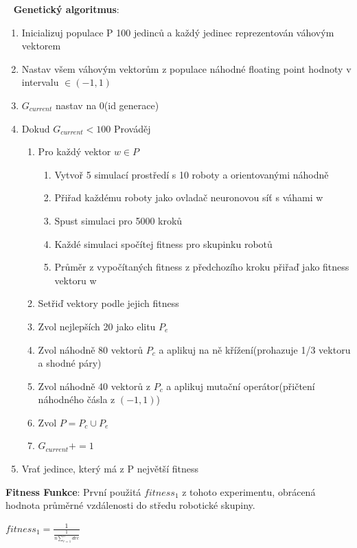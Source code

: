 \ \newline
\textbf{Genetický algoritmus}:
\begin{enumerate}
    \item Inicializuj populace P 100 jedinců a každý jedinec reprezentován váhovým vektorem
    \item Nastav všem váhovým vektorům z populace náhodné floating point hodnoty v intervalu $\in (-1,1)$ 
    \item $G_{current}$ nastav na 0(id generace)
    \item Dokud $G_{current} < 100$ Prováděj \begin{enumerate}
        \item Pro každý vektor $w \in P$ \begin{enumerate}
            \item Vytvoř 5 simulací prostředí s 10 roboty a orientovanými náhodně
            \item Přiřad každému roboty jako ovladač neuronovou síť s váhami w
            \item Spust simulaci pro 5000 kroků
            \item Každé simulaci spočítej fitness pro skupinku robotů
            \item Průměr z vypočítaných fitness z předchozího kroku přiřaď jako fitness vektoru w
        \end{enumerate} 
    \item Setřiď vektory podle jejich fitness 
    \item Zvol nejlepších 20 jako elitu $P_{e}$
    \item Zvol náhodně 80 vektorů $P_c$ a aplikuj na ně křížení(prohazuje 1/3 vektoru a shodné páry)
    \item Zvol náhodně 40 vektorů z $P_c$ a aplikuj mutační operátor(přičtení náhodného čásla z $(-1,1)$)
    \item Zvol $P = P_c \cup P_e$
    \item $G_{current} += 1$
    \end{enumerate} 
    \item Vrať jedince, který má z P největší fitness    
\end{enumerate} 
\par 
\textbf{Fitness Funkce}: První použitá $fitness_1$ z tohoto experimentu, obrácená hodnota průměrné vzdálenosti do středu robotické skupiny. 
\par
\begin{center}
\textbf{$fitness_1 = \frac{1}{\frac{1}{n\sum\limits_{r=1}^{n} d{rc}}} $}
\end{center}
